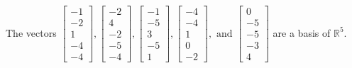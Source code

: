 \begin{exercise}
\begin{exerciseStatement}
  \end{exerciseStatement}
  \begin{exerciseAnswer}
   The vectors \(\left[\begin{array}{r}
-1 \\
-2 \\
1 \\
-4 \\
-4
\end{array}\right] , \left[\begin{array}{r}
-2 \\
4 \\
-2 \\
-5 \\
-4
\end{array}\right] , \left[\begin{array}{r}
-1 \\
-5 \\
3 \\
-5 \\
1
\end{array}\right] , \left[\begin{array}{r}
-4 \\
-4 \\
1 \\
0 \\
-2
\end{array}\right] , \text{ and } \left[\begin{array}{r}
0 \\
-5 \\
-5 \\
-3 \\
4
\end{array}\right]\) 
  	 are  a basis of \(\mathbb{R}^5\).
  


  \end{exerciseAnswer}
\end{exercise}